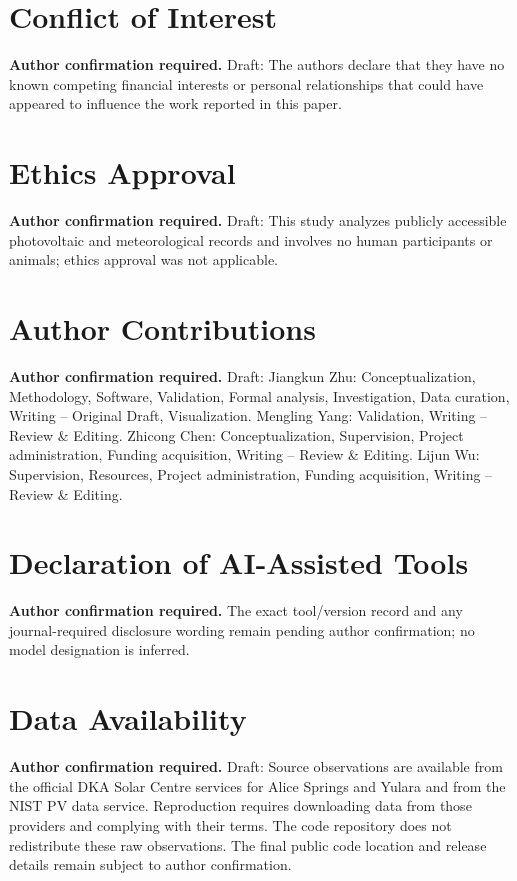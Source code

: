 \documentclass[aip,reprint,floatfix,amsmath,amssymb]{revtex4-2}
\begin{document}
\section*{Conflict of Interest}
\textbf{Author confirmation required.} Draft: The authors declare that they have no known competing financial interests or personal relationships that could have appeared to influence the work reported in this paper.

\section*{Ethics Approval}
\textbf{Author confirmation required.} Draft: This study analyzes publicly accessible photovoltaic and meteorological records and involves no human participants or animals; ethics approval was not applicable.

\section*{Author Contributions}
\textbf{Author confirmation required.} Draft: Jiangkun Zhu: Conceptualization, Methodology, Software, Validation, Formal analysis, Investigation, Data curation, Writing -- Original Draft, Visualization. Mengling Yang: Validation, Writing -- Review \& Editing. Zhicong Chen: Conceptualization, Supervision, Project administration, Funding acquisition, Writing -- Review \& Editing. Lijun Wu: Supervision, Resources, Project administration, Funding acquisition, Writing -- Review \& Editing.

\section*{Declaration of AI-Assisted Tools}
\textbf{Author confirmation required.} The exact tool/version record and any journal-required disclosure wording remain pending author confirmation; no model designation is inferred.

\section*{Data Availability}
\textbf{Author confirmation required.} Draft: Source observations are available from the official DKA Solar Centre services for Alice Springs and Yulara and from the NIST PV data service.\cite{DKASC2026,YularaData,NISTData} Reproduction requires downloading data from those providers and complying with their terms. The code repository does not redistribute these raw observations. The final public code location and release details remain subject to author confirmation.
\end{document}
